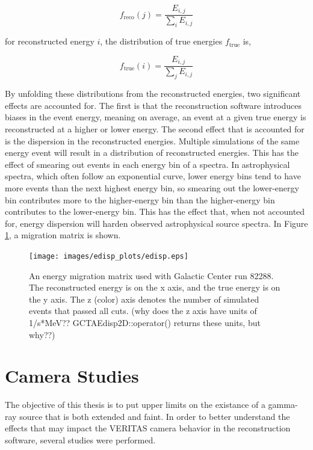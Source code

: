     \begin{equation}
      \label{eqn:edispreco}
      f_{\text{reco}}(j)=\frac{E_{i,j}}{ \sum_{i}E_{i,j} }
    \end{equation}

    for reconstructed energy $i$, the distribution of true energies $f_{\text{true}}$ is,

    \begin{equation}
      \label{eqn:edisptrue}
      f_{\text{true}}(i)=\frac{E_{i,j}}{ \sum_{j}E_{i,j} }
    \end{equation}

    By unfolding these distributions from the reconstructed energies, two significant effects are accounted for.
    The first is that the reconstruction software introduces biases in the event energy, meaning on average, an event at a given true energy is reconstructed at a higher or lower energy.
    The second effect that is accounted for is the dispersion in the reconstructed energies.
    Multiple simulations of the same energy event will result in a distribution of reconstructed energies.
    This has the effect of smearing out events in each energy bin of a spectra.
    In astrophysical spectra, which often follow an exponential curve, lower energy bins tend to have more events than the next highest energy bin, so smearing out the lower-energy bin contributes more to the higher-energy bin than the higher-energy bin contributes to the lower-energy bin.
    This has the effect that, when not accounted for, energy dispersion will harden observed astrophysical source spectra.
    In Figure \ref{fig:migmatrix}, a migration matrix is shown.

    \begin{figure}[ht]
      \centering
      \texttt{[image: images/edisp\_plots/edisp.eps]}
      \caption[Energy Migration Matrix]{
        An energy migration matrix used with Galactic Center run 82288.
        The reconstructed energy is on the x axis, and the true energy is on the y axis.
        The z (color) axis denotes the number of simulated events that passed all cuts.
        {\color{red} (why does the z axis have units of 1/s*MeV?? GCTAEdisp2D::operator() returns these units, but why??)} 
      }
      \label{fig:migmatrix}
    \end{figure}

\section{Camera Studies}
  The objective of this thesis is to put upper limits on the existance of a gamma-ray source that is both extended and faint.
  In order to better understand the effects that may impact the VERITAS camera behavior in the reconstruction software, several studies were performed.

